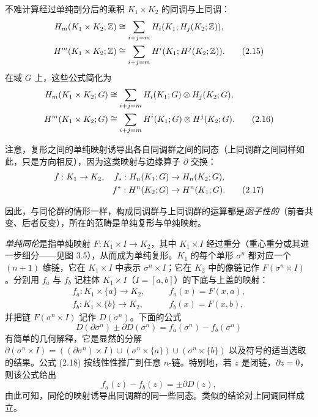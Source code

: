 不难计算经过单纯剖分后的乘积 $K_1\times K_2$ 的同调与上同调：
\begin{align}
  H_m(K_1\times K_2;\mathbb{Z}) &\cong \sum_{i+j=m}H_i(K_1;H_j(K_2;\mathbb{Z})),\notag\\
  H^m(K_1\times K_2;\mathbb{Z}) &\cong \sum_{i+j=m}H^i(K_1;H^j(K_2;\mathbb{Z})). \tag{2.15}
\end{align}
在域 $G$ 上，这些公式简化为
\begin{align}
  H_m(K_1\times K_2;G) &\cong \sum_{i+j=m}H_i(K_1;G)\otimes H_j(K_2;G),\notag\\
  H^m(K_1\times K_2;G) &\cong \sum_{i+j=m}H^i(K_1;G)\otimes H^j(K_2;G). \tag{2.16}
\end{align}

注意，复形之间的单纯映射诱导出各自同调群之间的同态（上同调群之间同样如此，只是方向相反），因为这类映射与边缘算子 $\partial$ 交换：
\begin{align}
  f: K_1 &\to K_2, & f_*: H_n(K_1;G) &\to H_n(K_2;G),\notag\\
  & & f^*: H^n(K_2;G) &\to H^n(K_1;G). \tag{2.17}
\end{align}

因此，与同伦群的情形一样，构成同调群与上同调群的运算都是\emph{函子性的}（前者共变、后者反变），所在的范畴是单纯复形与单纯映射。

\emph{单纯同伦}是指单纯映射 $F: K_1\times I\to K_2$，其中 $K_1\times I$ 经过重分（重心重分或其进一步细分——见图 3.5），从而成为单纯复形。$K_1$ 的每个单形 $\sigma^n$ 都对应一个 $(n+1)$ 维链，它在 $K_1\times I$ 中表示 $\sigma^n\times I$；它在 $K_2$ 中的像链记作 $F(\sigma^n\times I)$。分别用 $f_a$ 与 $f_b$ 记柱体 $K_1\times I$（$I=[a,b]$）的下底与上盖的映射：
\begin{align*}
  f_a: K_1\times\{a\}\to K_2, &\qquad f_a(x)=F(x,a),\\
  f_b: K_1\times\{b\}\to K_2, &\qquad f_b(x)=F(x,b),
\end{align*}
并把链 $F(\sigma^n\times I)$ 记作 $D(\sigma^n)$。下面的公式
\begin{equation}
  D(\partial\sigma^n)\pm\partial D(\sigma^n)=f_a(\sigma^n)-f_b(\sigma^n) \tag{2.18}
\end{equation}
有简单的几何解释，它是显然的分解 $\partial(\sigma^n\times I)
=((\partial\sigma^n)\times I)\cup(\sigma^n\times\{a\})\cup(\sigma^n\times\{b\})$
以及符号的适当选取的结果。公式 (2.18) 按线性性推广到任意 $n$-链。特别地，若 $z$ 是闭链，$\partial z=0$，则该公式给出
\begin{equation}
  f_a(z)-f_b(z)=\pm\partial D(z), \tag{2.19}
\end{equation}
由此可知，同伦的映射诱导出同调群的同一些同态。类似的结论对上同调同样成立。

